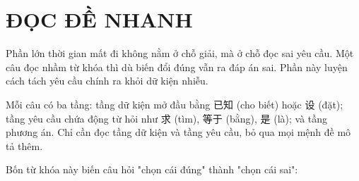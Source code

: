 \documentclass[11pt, a4paper]{article}
\begin{document}
\section{ĐỌC ĐỀ NHANH}

Phần lớn thời gian mất đi không nằm ở chỗ giải, mà ở chỗ đọc sai yêu cầu. Một câu đọc nhầm từ khóa thì dù biến đổi đúng vẫn ra đáp án sai. Phần này luyện cách tách yêu cầu chính ra khỏi dữ kiện nhiễu.

\begin{dinhly}
Mỗi câu có ba tầng: tầng dữ kiện mở đầu bằng 已知 (cho biết) hoặc 设 (đặt); tầng yêu cầu chứa động từ hỏi như 求 (tìm), 等于 (bằng), 是 (là); và tầng phương án. Chỉ cần đọc tầng dữ kiện và tầng yêu cầu, bỏ qua mọi mệnh đề mô tả thêm.
\end{dinhly}
\begin{dinhly}
Bốn từ khóa này biến câu hỏi "chọn cái đúng" thành "chọn cái sai":

\end{dinhly}
\end{document}
